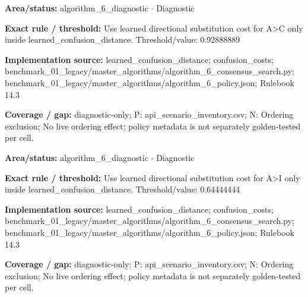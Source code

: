\begin{tcolorbox}[enhanced,breakable,colback=white,colframe=Muted!45,boxrule=0.45pt,arc=1.5pt,left=6pt,right=6pt,top=5pt,bottom=5pt,title={\texttt{A6-LEARNED-SUBSTITUTION-A-C}},title after break={\texttt{A6-LEARNED-SUBSTITUTION-A-C}\ (continued)},fonttitle=\headingfont\bfseries\color{Navy},coltitle=Navy]
\textbf{Area/status:} algorithm\_\allowbreak{}6\_\allowbreak{}diagnostic $\boldsymbol{\cdot}$ Diagnostic\par
\smallskip
\textbf{Exact rule / threshold:} Use learned directional substitution cost for A>C only inside learned\_\allowbreak{}confusion\_\allowbreak{}distance. Threshold/\allowbreak{}value: 0.92888889\par
\smallskip
\textbf{Implementation source:} learned\_\allowbreak{}confusion\_\allowbreak{}distance; confusion\_\allowbreak{}costs; benchmark\_\allowbreak{}01\_\allowbreak{}legacy/\allowbreak{}master\_\allowbreak{}algorithms/\allowbreak{}algorithm\_\allowbreak{}6\_\allowbreak{}consensus\_\allowbreak{}search.py; benchmark\_\allowbreak{}01\_\allowbreak{}legacy/\allowbreak{}master\_\allowbreak{}algorithms/\allowbreak{}algorithm\_\allowbreak{}6\_\allowbreak{}policy.json; Rulebook 14.3\par
\smallskip
\textbf{Coverage / gap:} diagnostic-only; P: api\_\allowbreak{}scenario\_\allowbreak{}inventory.csv; N: Ordering exclusion; No live ordering effect; policy metadata is not separately golden-tested per cell.
\end{tcolorbox}
\begin{tcolorbox}[enhanced,breakable,colback=white,colframe=Muted!45,boxrule=0.45pt,arc=1.5pt,left=6pt,right=6pt,top=5pt,bottom=5pt,title={\texttt{A6-LEARNED-SUBSTITUTION-A-I}},title after break={\texttt{A6-LEARNED-SUBSTITUTION-A-I}\ (continued)},fonttitle=\headingfont\bfseries\color{Navy},coltitle=Navy]
\textbf{Area/status:} algorithm\_\allowbreak{}6\_\allowbreak{}diagnostic $\boldsymbol{\cdot}$ Diagnostic\par
\smallskip
\textbf{Exact rule / threshold:} Use learned directional substitution cost for A>I only inside learned\_\allowbreak{}confusion\_\allowbreak{}distance. Threshold/\allowbreak{}value: 0.64444444\par
\smallskip
\textbf{Implementation source:} learned\_\allowbreak{}confusion\_\allowbreak{}distance; confusion\_\allowbreak{}costs; benchmark\_\allowbreak{}01\_\allowbreak{}legacy/\allowbreak{}master\_\allowbreak{}algorithms/\allowbreak{}algorithm\_\allowbreak{}6\_\allowbreak{}consensus\_\allowbreak{}search.py; benchmark\_\allowbreak{}01\_\allowbreak{}legacy/\allowbreak{}master\_\allowbreak{}algorithms/\allowbreak{}algorithm\_\allowbreak{}6\_\allowbreak{}policy.json; Rulebook 14.3\par
\smallskip
\textbf{Coverage / gap:} diagnostic-only; P: api\_\allowbreak{}scenario\_\allowbreak{}inventory.csv; N: Ordering exclusion; No live ordering effect; policy metadata is not separately golden-tested per cell.
\end{tcolorbox}
